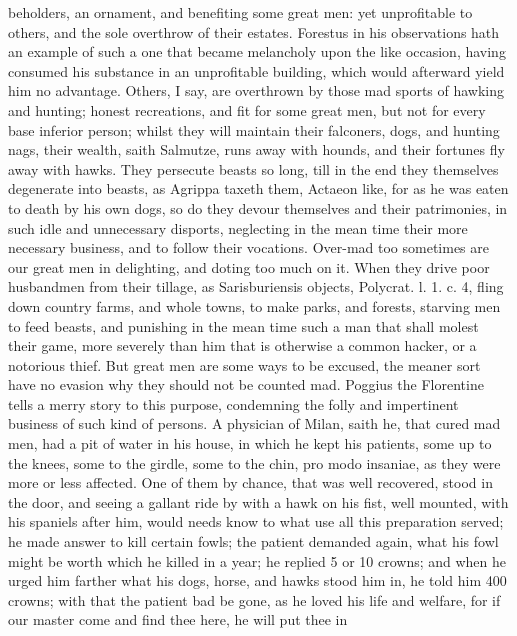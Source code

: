 {beholders, an ornament, and benefiting some great men: yet unprofitable
to others, and the sole overthrow of their estates. Forestus in his
observations hath an example of such a one that became melancholy upon
the like occasion, having consumed his substance in an unprofitable
building, which would afterward yield him no advantage. Others, I say,
are  overthrown by those mad sports of hawking and hunting;
honest recreations, and fit for some great men, but not for every base
inferior person; whilst they will maintain their falconers, dogs, and
hunting nags, their wealth, saith Salmutze, runs away with
hounds, and their fortunes fly away with hawks. They persecute beasts
so long, till in the end they themselves degenerate into beasts, as
Agrippa taxeth them, Actaeon like, for as he was eaten to
death by his own dogs, so do they devour themselves and their
patrimonies, in such idle and unnecessary disports, neglecting in the
mean time their more necessary business, and to follow their vocations.
Over-mad too sometimes are our great men in delighting, and doting too
much on it. When they drive poor husbandmen from their tillage,
as Sarisburiensis objects, Polycrat. l. 1. c. 4, fling down
country farms, and whole towns, to make parks, and forests, starving
men to feed beasts, and punishing in the mean time such a man
that shall molest their game, more severely than him that is otherwise
a common hacker, or a notorious thief. But great men are some ways to
be excused, the meaner sort have no evasion why they should not be
counted mad. Poggius the Florentine tells a merry story to this
purpose, condemning the folly and impertinent business of such kind of
persons. A physician of Milan, saith he, that cured mad men, had a pit
of water in his house, in which he kept his patients, some up to the
knees, some to the girdle, some to the chin, pro modo insaniae, as they
were more or less affected. One of them by chance, that was well
recovered, stood in the door, and seeing a gallant ride by with a hawk
on his fist, well mounted, with his spaniels after him, would needs
know to what use all this preparation served; he made answer to kill
certain fowls; the patient demanded again, what his fowl might be worth
which he killed in a year; he replied 5 or 10 crowns; and when he urged
him farther what his dogs, horse, and hawks stood him in, he told him
400 crowns; with that the patient bad be gone, as he loved his life and
welfare, for if our master come and find thee here, he will put thee in
}
